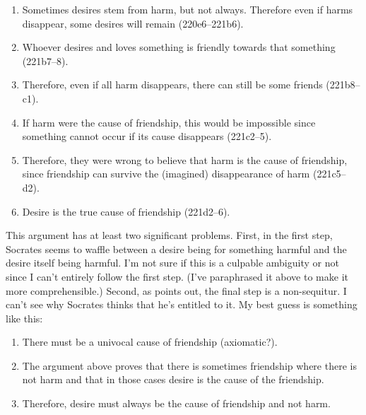 \documentclass[11pt]{article}
\begin{document}
\begin{enumerate}

    \item Sometimes desires stem from harm, but not always.  Therefore even if
        harms disappear, some desires will remain (220e6--221b6).

    \item Whoever desires and loves something is friendly towards that
        something (221b7--8).

    \item Therefore, even if all harm disappears, there can still be some
        friends (221b8--c1).

    \item If harm were the cause of friendship, this would be impossible since
        something cannot occur if its cause disappears (221c2--5).

    \item Therefore, they were wrong to believe that harm is the cause of
        friendship, since friendship can survive the (imagined) disappearance
        of harm (221c5--d2).

    \item Desire is the true cause of friendship (221d2--6).

\end{enumerate}

This argument has at least two significant problems.  First, in the first step,
Socrates seems to waffle between a desire being for something harmful and the
desire itself being harmful.  I'm not sure if this is a culpable ambiguity or
not since I can't entirely follow the first step. (I've paraphrased it above to
make it more comprehensible.)  Second, as \citet{watt1987} points out, the
final step is a non-sequitur.  I can't see why Socrates thinks that he's
entitled to it.  My best guess is something like this:

\begin{enumerate}

    \item There must be a univocal cause of friendship (axiomatic?).

    \item The argument above proves that there is sometimes friendship where
        there is not harm and that in those cases desire is the cause of the
        friendship.

    \item Therefore, desire must always be the cause of friendship and not
        harm.

\end{enumerate}
\end{document}
